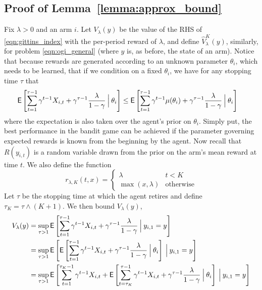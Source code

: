 \subsection{Proof of Lemma~\ref{lemma:approx_bound}} \label{prf:approx_bound}
\begin{myproof}[Proof.]
	Fix $\lambda > 0$ and an arm $i$. Let $V_\lambda(y)$ be the value of the RHS of \eqref{eqn:gittins_index} with the per-period reward  of $\lambda$, and define $\hat V^K_\lambda(y)$, similarly, for problem \eqref{eqn:ogi_general} (where $y$ is, as before, the state of an arm). Notice that because rewards are generated according to an unknown parameter $\theta_i$, which needs to be learned, that if we condition on a fixed $\theta_i$, we have for any stopping time $\tau$ that
	\begin{align} 
	\Ee{ \sum_{t=1}^{\tau-1} \gamma^{t-1}X_{i,t} + \gamma^{\tau-1} \frac{\lambda}{1-\gamma} \given[\Big] \theta_i} & \le  \Ee{ \sum_{t=1}^{\tau-1} \gamma^{t-1}\mu(\theta_i) + \gamma^{\tau-1} \frac{\lambda}{1-\gamma} \given[\Big] \theta_i} \label{bound:perfect_info}
	\end{align}
	where the expectation is also taken over the agent's prior on $\theta_i$. Simply put, the best performance in the bandit game can be achieved if the parameter governing expected rewards is known from the beginning by the agent. Now recall that $R(y_{i,t})$ is a random variable drawn from the prior on the arm's mean reward at time $t$. We also define the function 
	\[
	r_{\lambda,K}(t,x) = \begin{cases}
	\lambda & t < K \\
	\max(x,\lambda) & \text{otherwise}
	\end{cases}
	\] 
	Let $\tau$ be the stopping time at which the agent retires and define $\tau_K = \tau \wedge (K+1)$. We then bound $V_\lambda(y)$,
	\begin{align}
	V_\lambda(y) & =  \sup_{\tau > 1}\Ee{\sum_{t=1}^{\tau-1} \gamma^{t-1} X_{i,t} + \gamma^{\tau-1} \frac{\lambda}{1-\gamma}
		\given[\Big] y_{i,1} = y} \nonumber \\
	& = \sup_{\tau > 1}\Ee{\Ee{\sum_{t=1}^{\tau-1} \gamma^{t-1} X_{i,t} + \gamma^{\tau-1} \frac{\lambda}{1-\gamma}
			\given[\Big] \theta_i}\given[\Big] y_{i,1} = y} \nonumber \\
	& = \sup_{\tau > 1}\Ee{\sum_{t=1}^{\tau_K-1} \gamma^{t-1} X_{i,t} + \Ee{\sum_{t=\tau_K}^{\tau-1} \gamma^{t-1} X_{i,t} + \gamma^{\tau-1} \frac{\lambda}{1-\gamma} \given[\Big] \theta_i}\given[\Big] y_{i,1} = y} \nonumber \\

\end{align}
\end{myproof}
